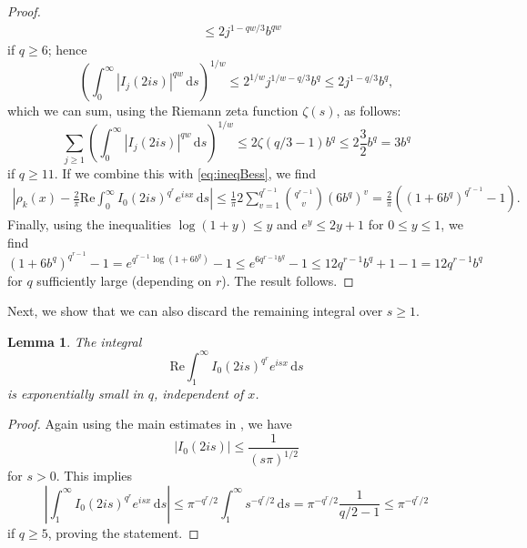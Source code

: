 \documentclass[12pt,reqno]{amsart}
\theoremstyle{definition}
\theoremstyle{plain}
\newtheorem{lemma}[theorem]{Lemma}
\theoremstyle{definition}
\renewcommand{\geq}{\geqslant}
\renewcommand{\leq}{\leqslant}
\renewcommand{\Re}{\mathrm{Re}}
\renewcommand{\d}{\mathrm{d}}
\begin{document}
\begin{proof}
\begin{align*}
		& \leq 2 j^{1-qw/3} b^{qw}
	\end{align*}
	if $q \geq 6$; hence 
	\[
	\left( \int_0^\infty |I_{j}(2 i s)|^{qw} \, \d s \right)^{1/w} \leq 2^{1/w} j^{1/w-q/3} b^{q} \leq 2 j^{1-q/3} b^{q}, 
	\]
	which we can sum, using the Riemann zeta function $\zeta(s)$, as follows: 
	\[
	\sum_{j \geq 1} \left(\int_0^{\infty} |I_{j}(2 i s)|^{qw} \, \d s\right)^{1/w} \leq 2 \zeta(q/3 - 1) b^q \leq 2 \frac{3}{2} b^q = 3 b^q
	\]
	if $q \geq 11$. If we combine this with \eqref{eq:ineqBess}, we find 
	\begin{align}
		\label{differenceRHOk}
		\left| \rho_{k}(x) - \frac{2}{\pi} \Re \int_{0}^{\infty} I_{0}(2 i s)^{q^r} e^{i s x} \, \d s \right| \leq
		\frac{1}{\pi} 2 \sum_{v = 1}^{q^{r-1}}\binom{q^{r-1}}{v} (6 b^q)^v =\frac{2}{\pi} \left( (1 + 6 b^q)^{q^{r-1}} - 1 \right).
	\end{align}
	Finally, using the inequalities $\log(1+y) \leq y$ and $e^y \leq 2y + 1$ for $0 \leq y \leq 1$, we find 
	\[ (1 + 6 b^q)^{q^{r-1}} - 1 = e^{q^{r-1} \log(1 + 6 b^q )} - 1 \leq  e^{6 q^{r-1}  b^q} - 1 \leq 12 q^{r-1}  b^q + 1 - 1 = 12 q^{r-1}  b^q\]
	for $q$ sufficiently large (depending on $r$). The result follows. 
\end{proof}

Next, we show that we can also discard the remaining integral over $s \geq 1$. 

\begin{lemma}
	\label{lem:726}
	The integral
	\[
	\Re \int_{1}^{\infty} I_{0}(2 i s)^{q^r} e^{i s x} \, \d s
	\]
	is exponentially small in $q$, independent of $x$.
\end{lemma}
\begin{proof}
	Again using the main estimates in \cite{Landau}, we have
	\[
	|I_{0}(2 i s)| \leq \frac{1}{(s \pi)^{1/2}}
	\]
	for $s > 0$.
	This implies
	\[
	\left| \int_{1}^{\infty} I_{0}(2 i s)^{q^r} e^{i s x} \, \d s \right| \leq \pi^{-q^r/2} \int_1^\infty s^{-q^r/2} \, \d s = \pi^{-q^r/2} \frac{1}{q/2 - 1} \leq  \pi^{-q^r/2}
	\]
	if $q \geq 5$, proving the statement.
\end{proof}
\end{document}
